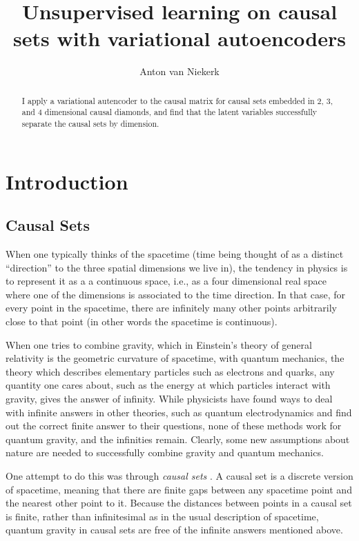 \documentclass[letterpaper,10pt]{article}
\title{Unsupervised learning on causal sets with variational autoencoders}
\author{Anton van Niekerk}
\begin{document}
\maketitle

\begin{abstract}
I apply a variational autencoder to the causal matrix for causal sets embedded in $2$, $3$, and $4$ dimensional causal diamonds, 
and find that the latent variables successfully separate the causal sets by dimension.
\end{abstract}


\section{Introduction}

\subsection{Causal Sets}

When one typically thinks of the spacetime (time being thought of as a distinct ``direction'' to the three spatial dimensions we live in), 
the tendency in physics is to represent it as a a continuous space, i.e., as a four dimensional real
space where one of the dimensions is associated to the time direction.  In that case, for every point in the spacetime, there are infinitely many other 
points arbitrarily close to that point (in other words the spacetime is continuous).

When one tries to combine gravity, which in Einstein's theory of general relativity is the geometric curvature of spacetime, 
with quantum mechanics, the theory which describes elementary particles such as electrons and quarks, any quantity one cares about, such as the 
energy at which particles interact with gravity, gives the answer of infinity.  While physicists have found ways to deal with infinite answers in other 
theories, such as quantum electrodynamics and find out the correct finite answer to their questions, none of these methods work for quantum gravity, and 
the infinities remain.  Clearly, some new assumptions about nature are needed to successfully combine gravity and quantum mechanics.

One attempt to do this was through {\it causal sets} \cite{causalsets}.  A causal set is a discrete version of spacetime, meaning that there are finite gaps 
between any spacetime point and the nearest other point to it.  Because the distances between points in a causal set is finite, rather than infinitesimal 
as in the usual description of spacetime, quantum gravity in causal sets are free of the infinite answers mentioned above.
\end{document}
